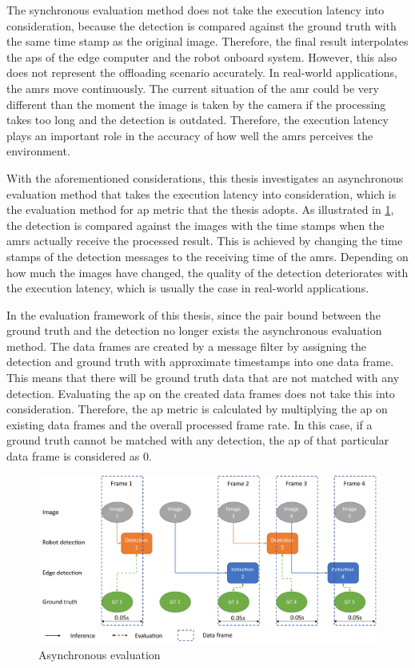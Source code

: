 The synchronous evaluation method does not take the execution latency into consideration, because the detection is compared against the ground truth with the same time stamp as the original image. Therefore, the final result interpolates the \glspl{ap} of the edge computer and the robot onboard system. However, this also does not represent the offloading scenario accurately. In real-world applications, the \glspl{amr} move continuously. The current situation of the \gls{amr} could be very different than the moment the image is taken by the camera if the processing takes too long and the detection is outdated. Therefore, the execution latency plays an important role in the accuracy of how well the \glspl{amr} perceives the environment. 

With the aforementioned considerations, this thesis investigates an asynchronous evaluation method that takes the execution latency into consideration, which is the evaluation method for \gls{ap} metric that the thesis adopts. As illustrated in \cref{fig:async_eval}, the detection is compared against the images with the time stamps when the \glspl{amr} actually receive the processed result. This is achieved by changing the time stamps of the detection messages to the receiving time of the \glspl{amr}. Depending on how much the images have changed, the quality of the detection deteriorates with the execution latency, which is usually the case in real-world applications.

In the evaluation framework of this thesis, since the pair bound between the ground truth and the detection no longer exists the asynchronous evaluation method. The data frames are created by a message filter by assigning the detection and ground truth with approximate timestamps into one data frame. This means that there will be ground truth data that are not matched with any detection. Evaluating the \gls{ap} on the created data frames does not take this into consideration. Therefore, the \gls{ap} metric is calculated by multiplying the \gls{ap} on existing data frames and the overall processed frame rate. In this case, if a ground truth cannot be matched with any detection, the \gls{ap} of that particular data frame is considered as 0.

\begin{figure}[htp]
    \centering
    \includegraphics[width=\linewidth]{figures/setup/async_eval.pdf}
    \caption{Asynchronous evaluation}
    \label{fig:async_eval}
\end{figure}

